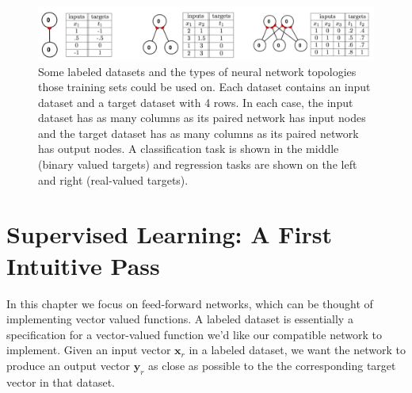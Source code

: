 \begin{figure}[h]
\centering
\includegraphics[scale=.4]{./images/TablesAndNets.png}
\caption[Jeff Yoshimi.]{Some labeled datasets and the types of neural network topologies those training sets could be used on. Each dataset contains an input dataset and a target dataset with 4 rows. In each case, the input dataset has as many columns as its paired network has input nodes and the target dataset has as many columns as its paired network has output nodes. A classification task is shown in the middle (binary valued targets) and regression tasks are shown on the left and right (real-valued targets).}
\label{tables_nets}
\end{figure}

\section{Supervised Learning: A First Intuitive Pass}\label{SupervisedFirstPass}

In this chapter we focus on feed-forward networks, which can be thought of implementing vector valued functions. A labeled dataset is essentially a specification for a vector-valued function we'd like our compatible network to implement. Given an input vector $\mathbf{x}_r$ in a labeled dataset, we want the network to produce an output vector $\mathbf{y}_r$ as close as possible to the the corresponding target vector in that dataset. 


